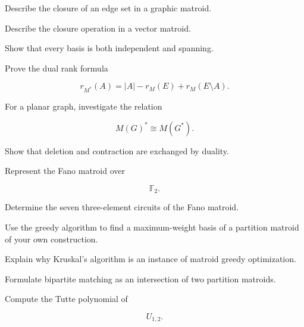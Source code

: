 \begin{exercise}[3]
Describe the closure of an edge set in a graphic matroid.
\end{exercise}

\begin{exercise}[3]
Describe the closure operation in a vector matroid.
\end{exercise}

\begin{exercise}[3]
Show that every basis is both independent and spanning.
\end{exercise}

\begin{exercise}[3]
Prove the dual rank formula

\[
r_{M^*}(A)
=
|A|-r_M(E)+r_M(E\setminus A).
\]
\end{exercise}

\begin{exercise}[3]
For a planar graph, investigate the relation

\[
M(G)^*
\cong
M(G^*).
\]
\end{exercise}

\begin{exercise}[3]
Show that deletion and contraction are exchanged by duality.
\end{exercise}

\begin{exercise}[3]
Represent the Fano matroid over

\[
\mathbb{F}_2.
\]
\end{exercise}

\begin{exercise}[3]
Determine the seven three-element circuits of the Fano matroid.
\end{exercise}

\begin{exercise}[3]
Use the greedy algorithm to find a maximum-weight basis of a partition
matroid of your own construction.
\end{exercise}

\begin{exercise}[3]
Explain why Kruskal's algorithm is an instance of matroid greedy
optimization.
\end{exercise}

\begin{exercise}[3]
Formulate bipartite matching as an intersection of two partition
matroids.
\end{exercise}

\begin{exercise}[3]
Compute the Tutte polynomial of

\[
U_{1,2}.
\]
\end{exercise}

